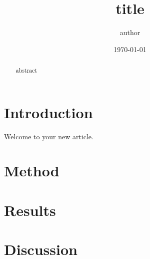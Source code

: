 \documentclass[11pt]{article}
\title{{{title}}}
\author{{{author}}}
\date{\today}
\begin{document}
\maketitle

\begin{abstract}
{{abstract}}
\end{abstract}

\section{Introduction}

Welcome to your new article.

\section{Method}

\section{Results}

\section{Discussion}
\end{document}
